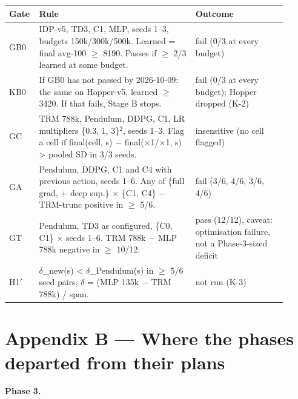 \documentclass[11pt]{article}
\begin{document}
\begin{center}\small\begin{tabular}{>{\raggedright\arraybackslash}p{0.058\linewidth}>{\raggedright\arraybackslash}p{0.533\linewidth}>{\raggedright\arraybackslash}p{0.315\linewidth}}
\toprule
Gate & Rule & Outcome \\
\midrule
GB0 & IDP-v5, TD3, C1, MLP, seeds 1--3, budgets 150k/300k/500k. Learned = final avg-100 $\geq$ 8190. Passes if $\geq$ 2/3 learned at some budget. & fail (0/3 at every budget) \\
KB0 & If GB0 has not passed by 2026-10-09: the same on Hopper-v5, learned $\geq$ 3420. If that fails, Stage B stops. & fail (0/3 at every budget); Hopper dropped (K-2) \\
GC & TRM 788k, Pendulum, DDPG, C1, LR multipliers \{0.3, 1, 3\}$^2$, seeds 1--3. Flag a cell if final(cell, s) $-$ final($\times$1/$\times$1, s) > pooled SD in 3/3 seeds. & insensitive (no cell flagged) \\
GA & Pendulum, DDPG, C1 and C4 with previous action, seeds 1--6. Any of \{full grad, + deep sup.\} $\times$ \{C1, C4\} $-$ TRM-trunc positive in $\geq$ 5/6. & fail (3/6, 4/6, 3/6, 4/6) \\
GT & Pendulum, TD3 as configured, \{C0, C1\} $\times$ seeds 1--6. TRM 788k $-$ MLP 788k negative in $\geq$ 10/12. & pass (12/12), caveat: optimisation failure, not a Phase-3-sized deficit \\
H1$'$ & $\delta$\_new(s) < $\delta$\_Pendulum(s) in $\geq$ 5/6 seed pairs, $\delta$ = (MLP 135k $-$ TRM 788k) / span. & not run (K-3) \\
\bottomrule
\end{tabular}\end{center}



\section*{Appendix B --- Where the phases departed from their plans}



\textbf{Phase 3.}
\end{document}
